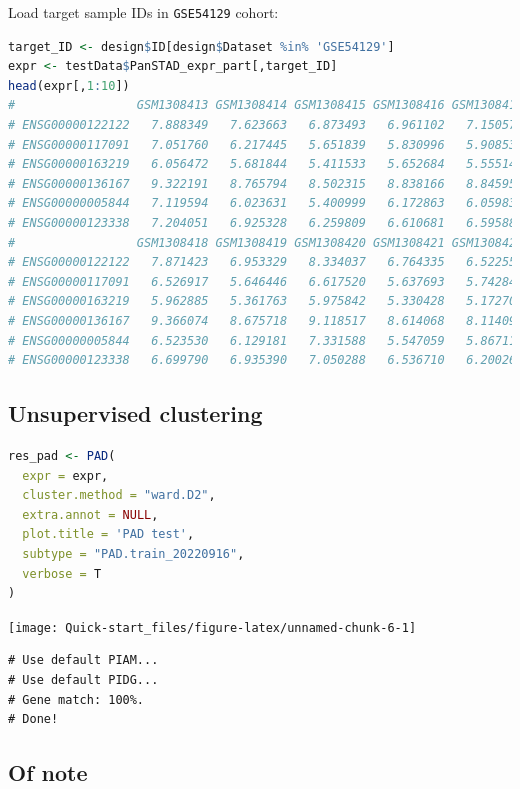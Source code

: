 \documentclass[
  12pt,
]{book}
\newcommand{\passthrough}[1]{#1}
\begin{document}
Load target sample IDs in \passthrough{\lstinline!GSE54129!} cohort:

\begin{lstlisting}[language=R]
target_ID <- design$ID[design$Dataset %in% 'GSE54129']
expr <- testData$PanSTAD_expr_part[,target_ID]
head(expr[,1:10])
#                 GSM1308413 GSM1308414 GSM1308415 GSM1308416 GSM1308417
# ENSG00000122122   7.888349   7.623663   6.873493   6.961102   7.150572
# ENSG00000117091   7.051760   6.217445   5.651839   5.830996   5.908532
# ENSG00000163219   6.056472   5.681844   5.411533   5.652684   5.555147
# ENSG00000136167   9.322191   8.765794   8.502315   8.838166   8.845952
# ENSG00000005844   7.119594   6.023631   5.400999   6.172863   6.059838
# ENSG00000123338   7.204051   6.925328   6.259809   6.610681   6.595882
#                 GSM1308418 GSM1308419 GSM1308420 GSM1308421 GSM1308422
# ENSG00000122122   7.871423   6.953329   8.334037   6.764335   6.522554
# ENSG00000117091   6.526917   5.646446   6.617520   5.637693   5.742848
# ENSG00000163219   5.962885   5.361763   5.975842   5.330428   5.172705
# ENSG00000136167   9.366074   8.675718   9.118517   8.614068   8.114096
# ENSG00000005844   6.523530   6.129181   7.331588   5.547059   5.867118
# ENSG00000123338   6.699790   6.935390   7.050288   6.536710   6.200269
\end{lstlisting}

\hypertarget{unsupervised-clustering}{%
\subsection{Unsupervised clustering}\label{unsupervised-clustering}}

\begin{lstlisting}[language=R]
res_pad <- PAD(
  expr = expr,
  cluster.method = "ward.D2",
  extra.annot = NULL,
  plot.title = 'PAD test',
  subtype = "PAD.train_20220916",
  verbose = T
)
\end{lstlisting}

\begin{center}\texttt{[image: Quick-start\_files/figure-latex/unnamed-chunk-6-1]} \end{center}

\begin{lstlisting}
# Use default PIAM... 
# Use default PIDG... 
# Gene match: 100%. 
# Done!
\end{lstlisting}

\hypertarget{of-note}{%
\subsection{Of note}\label{of-note}}
\end{document}
